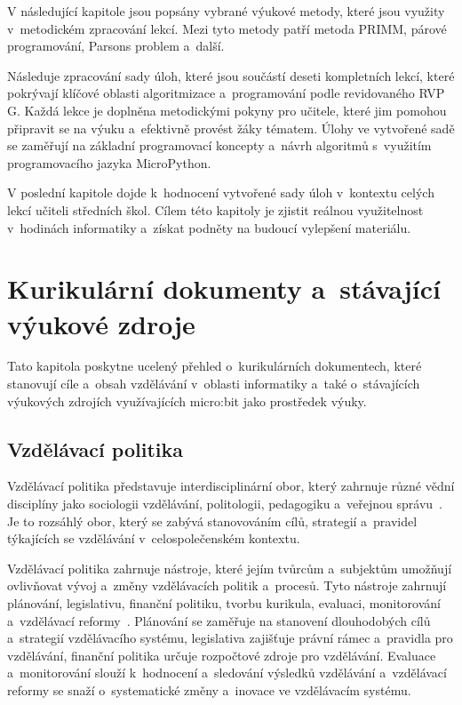 \documentclass[
  digital,     %
  oneside,     %
  nosansbold,  %
  colorbold, %
  lof,         %
  nolot,         %
]{fithesis4}
\begin{document}
V následující kapitole jsou popsány vybrané výukové metody, které jsou využity v~metodickém zpracování lekcí. Mezi tyto metody patří metoda PRIMM, párové programování, Parsons problem a~další. 

Následuje zpracování sady úloh, které jsou součástí deseti kompletních lekcí, které pokrývají klíčové oblasti algoritmizace a~programování podle revidovaného RVP G. Každá lekce je doplněna metodickými pokyny pro učitele, které jim pomohou připravit se na výuku a~efektivně provést žáky tématem. Úlohy ve vytvořené sadě se zaměřují na základní programovací koncepty a~návrh algoritmů s~využitím programovacího jazyka MicroPython. %

V poslední kapitole dojde k~hodnocení vytvořené sady úloh v~kontextu celých lekcí učiteli středních škol. Cílem této kapitoly je zjistit reálnou využitelnost v~hodinách informatiky a~získat podněty na budoucí vylepšení materiálu.

\chapter{Kurikulární dokumenty a~stávající výukové zdroje}
Tato kapitola poskytne ucelený přehled o~kurikulárních dokumentech, které stanovují cíle a~obsah vzdělávání v~oblasti informatiky a~také o~stávajících výukových zdrojích využívajících micro:bit jako prostředek výuky.

\section{Vzdělávací politika}
Vzdělávací politika představuje interdisciplinární obor, který zahrnuje různé vědní disciplíny jako sociologii vzdělávání, politologii, pedagogiku a~veřejnou správu~\cite{Kalous06}. Je to rozsáhlý obor, který se zabývá stanovováním cílů, strategií a~pravidel týkajících se vzdělávání v~celospolečenském kontextu.

Vzdělávací politika zahrnuje nástroje, které jejím tvůrcům a~subjektům umožňují ovlivňovat vývoj a~změny vzdělávacích politik a~procesů. Tyto nástroje zahrnují plánování, legislativu, finanční politiku, tvorbu kurikula, evaluaci, monitorování a~vzdělávací reformy~\cite{Kalous97}. Plánování se zaměřuje na stanovení dlouhodobých cílů a~strategií vzdělávacího systému, legislativa zajišťuje právní rámec a~pravidla pro vzdělávání, finanční politika určuje rozpočtové zdroje pro vzdělávání. Evaluace a~monitorování slouží k~hodnocení a~sledování výsledků vzdělávání a~vzdělávací reformy se snaží o~systematické změny a~inovace ve vzdělávacím systému.
\end{document}
